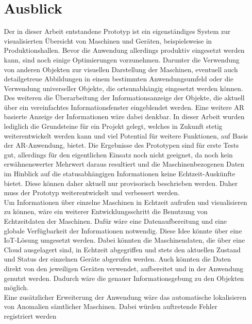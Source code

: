 \chapter{Ausblick}
\label{chap:Ausblick}
Der in dieser Arbeit entstandene Prototyp ist ein eigenständiges System zur visualisierten Übersicht von Maschinen und Geräten, beispielsweise in Produktionshallen. 
Bevor die Anwendung allerdings produktiv eingesetzt werden kann, sind noch einige Optimierungen vorzunehmen. Darunter die Verwendung von anderen Objekten 
zur visuellen Darstellung der Maschinen, eventuell auch detailgetreue Abbildungen in einem bestimmten Anwendungsumfeld oder die Verwendung universeller Objekte, die 
ortsunabhängig eingesetzt werden können. Des weiteren die Überarbeitung der Informationsanzeige der Objekte, die aktuell über ein vereinfachtes Informationsfenster 
eingeblendet werden. Eine weitere \acl{AR} basierte Anzeige der Informationen wäre dabei denkbar. In dieser Arbeit wurden lediglich die Grundsteine für ein Projekt 
gelegt, welches in Zukunft stetig weiterentwickelt werden kann und viel Potential für weitere Funktionen, auf Basis der \acs{AR}-Anwendung, bietet. Die Ergebnisse 
des Prototypen sind für erste Tests gut, allerdings für den eigentlichen Einsatz noch nicht geeignet, da noch kein erwähnenswerter Mehrwert daraus resultiert und die 
Maschinenbezogenen Daten im Hinblick auf die statusabhängigen Informationen keine Echtzeit-Auskünfte bietet. Diese können daher aktuell nur provisorisch beschrieben 
werden. Daher muss der Prototyp weiterentwickelt und verbessert werden. 
\\ 
\linebreak
Um Informationen über einzelne Maschinen in Echtzeit aufrufen und visualisieren zu können, wäre ein weiterer Entwicklungsschritt die Benutzung von Echtzeitdaten der 
Maschinen. Dafür wäre eine Datenaufbereitung und eine globale Verfügbarkeit der Informationen notwendig. Diese Idee könnte über eine \acl{IoT}-Lösung umgesetzt werden. 
Dabei könnten die Maschinendaten, die über eine Cloud ausgelagert sind, in Echtzeit abgegriffen und stets den aktuellen Zustand und Status der einzelnen Geräte 
abgerufen werden. Auch könnten die Daten direkt von den jeweiligen Geräten verwendet, aufbereitet und in der Anwendung genutzt werden. Dadurch wäre die genauer 
Informationsgebung zu den Objekten möglich.
\\ 
\linebreak
Eine zusätzlicher Erweiterung der Anwendung wäre das automatische lokalisieren von Anomalien sämtlicher Maschinen. Dabei würden auftretende Fehler registriert werden 
